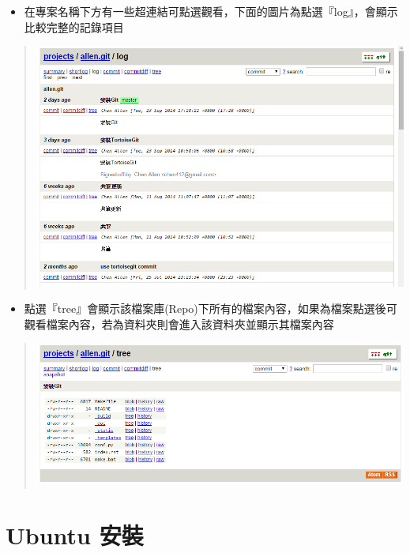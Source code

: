 \documentclass[letterpaper,10pt,english]{sphinxmanual}
\begin{document}
\begin{itemize}
\item {} 
在專案名稱下方有一些超連結可點選觀看，下面的圖片為點選『log』，會顯示比較完整的記錄項目

\end{itemize}
\begin{quote}

\includegraphics{gitweb-005.png}
\end{quote}
\begin{itemize}
\item {} 
點選『tree』會顯示該檔案庫(Repo)下所有的檔案內容，如果為檔案點選後可觀看檔案內容，若為資料夾則會進入該資料夾並顯示其檔案內容

\end{itemize}
\begin{quote}

\includegraphics{gitweb-006.png}
\end{quote}


\chapter{Ubuntu 安裝}
\label{_doc/ubuntu/index::doc}\label{_doc/ubuntu/index:ubuntu}
\end{document}
